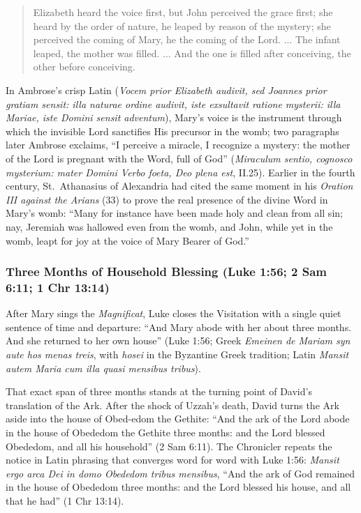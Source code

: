 \begin{quote}\small
Elizabeth heard the voice first, but John perceived the grace first; she heard by the order of nature, he leaped by reason of the mystery; she perceived the coming of Mary, he the coming of the Lord. ... The infant leaped, the mother was filled. ... And the one is filled after conceiving, the other before conceiving.
\end{quote}

In Ambrose's crisp Latin (\textit{Vocem prior Elizabeth audivit, sed Joannes prior gratiam sensit: illa naturae ordine audivit, iste exsultavit ratione mysterii: illa Mariae, iste Domini sensit adventum}), Mary's voice is the instrument through which the invisible Lord sanctifies His precursor in the womb; two paragraphs later Ambrose exclaims, ``I perceive a miracle, I recognize a mystery: the mother of the Lord is pregnant with the Word, full of God'' (\textit{Miraculum sentio, cognosco mysterium: mater Domini Verbo foeta, Deo plena est}, II.25). Earlier in the fourth century, St.\ Athanasius of Alexandria had cited the same moment in his \textit{Oration III against the Arians} (33) to prove the real presence of the divine Word in Mary's womb: ``Many for instance have been made holy and clean from all sin; nay, Jeremiah was hallowed even from the womb, and John, while yet in the womb, leapt for joy at the voice of Mary Bearer of God.''

\subsubsection{Three Months of Household Blessing (Luke 1:56; 2 Sam 6:11; 1 Chr 13:14)}

After Mary sings the \textit{Magnificat}, Luke closes the Visitation with a single quiet sentence of time and departure: ``And Mary abode with her about three months. And she returned to her own house'' (Luke 1:56; Greek \textit{Emeinen de Mariam syn aute hos menas treis}, with \textit{hosei} in the Byzantine Greek tradition; Latin \textit{Mansit autem Maria cum illa quasi mensibus tribus}).

That exact span of three months stands at the turning point of David's translation of the Ark. After the shock of Uzzah's death, David turns the Ark aside into the house of Obed-edom the Gethite: ``And the ark of the Lord abode in the house of Obededom the Gethite three months: and the Lord blessed Obededom, and all his household'' (2 Sam 6:11). The Chronicler repeats the notice in Latin phrasing that converges word for word with Luke 1:56: \textit{Mansit ergo arca Dei in domo Obededom tribus mensibus}, ``And the ark of God remained in the house of Obededom three months: and the Lord blessed his house, and all that he had'' (1 Chr 13:14).

